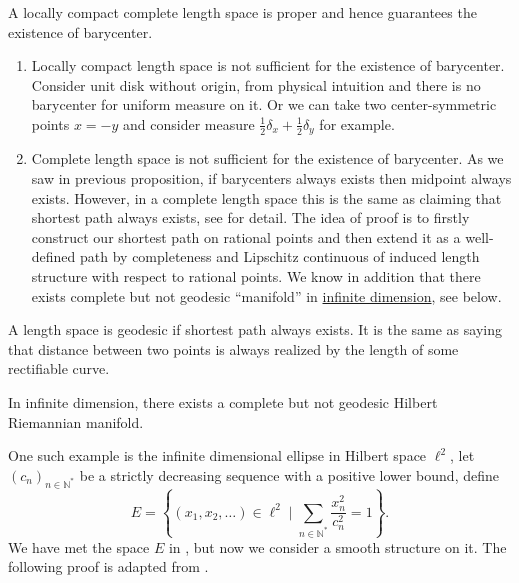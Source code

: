 \begin{example}
	A locally compact complete length space is proper and hence guarantees the existence of barycenter.
	\begin{enumerate}
		\item Locally compact length space is not sufficient for the existence of barycenter.
		      Consider unit disk without origin,
		      from physical intuition and there is no barycenter for uniform measure on it.
		      Or we can take two center-symmetric points $x = - y$ and
		      consider measure $\frac{1}{2}\delta_x + \frac{1}{2}\delta_y$ for example.
		\item Complete length space is not sufficient for the existence of barycenter.
		      As we saw in previous proposition, if barycenters always exists then midpoint always exists.
		      However, in a complete length space this is the same as claiming that shortest path always exists,
		      see \cite[Theorem 2.4.16]{burago2001course} for detail.
		      The idea of proof is to firstly construct our shortest path on rational points and then extend it
		      as a well-defined path by completeness and Lipschitz continuous of induced length structure with respect to rational points.
		      We know in addition that there exists complete but not geodesic ``manifold''
		      in \underline{infinite dimension}, see  below.
	\end{enumerate}
\end{example}

\begin{defn}
	A length space is geodesic if shortest path always exists.
	It is the same as saying that distance between two points is always realized by the length of some rectifiable curve.
\end{defn}

\begin{lem}
	\label{lem:infinite_not_geodesic_manifold}
	In infinite dimension, there exists a complete but not geodesic Hilbert Riemannian manifold.
\end{lem}

One such example is the infinite dimensional ellipse in Hilbert space $\ell^2$,
let $(c_n)_{n \in \mathbb{N}^*}$ be a strictly decreasing sequence with a positive lower bound, define
\[
	E = \left\{ \left( x _ { 1 } , x _ { 2 } , \ldots \right) \in \ell^2 \mid \sum _ { n \in \mathbb { N }^* } \frac { x _ { n } ^ { 2 } } { c _ { n } ^ { 2 } } = 1 \right\}.
\]
We have met the space $E$ in ,
but now we consider a smooth structure on it.
The following proof is adapted from \cite[Example 5.1]{grossman1965hilbert}.

